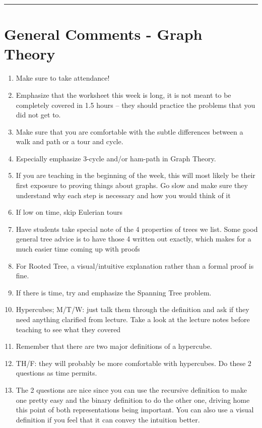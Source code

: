 \documentclass{exam}
\title{}
\date{Graphs, Trees, Hypercubes}
\begin{document}
\maketitle
\rule{\textwidth}{0.15em}
\fontsize{12}{15}\selectfont
\thispagestyle{empty}


\section{General Comments - Graph Theory}
\begin{enumerate}
\item Make sure to take attendance!
\item Emphasize that the worksheet this week is long, it is not meant to be completely covered in 1.5 hours -- they should practice the problems that you did not get to.
\item Make sure that you are comfortable with the subtle differences between a walk and path or a tour and cycle. 
\item Especially emphasize 3-cycle and/or ham-path in Graph Theory.
\item If you are teaching in the beginning of the week, this will most likely be their first exposure to proving things about graphs. Go slow and make sure they understand why each step is necessary and how you would think of it
\item If low on time, skip Eulerian tours
\item Have students take special note of the 4 properties of trees we list. Some good general tree advice is to have those 4 written out exactly, which makes for a much easier time coming up with proofs
\item For Rooted Tree, a visual/intuitive explanation rather than a formal proof is fine. 
\item If there is time, try and emphasize the Spanning Tree problem.
\item Hypercubes; M/T/W: just talk them through the definition and ask if they need anything clarified from lecture. Take a look at the lecture notes before teaching to see what they covered
\item Remember that there are two major definitions of a hypercube. 
\item TH/F: they will probably be more comfortable with hypercubes. Do these 2 questions as time permits.
\item The 2 questions are nice since you can use the recursive definition to make one pretty easy and the binary definition to do the other one, driving home this point of both representations being important. You can also use a visual definition if you feel that it can convey the intuition better.
\end{enumerate}
\end{document}
